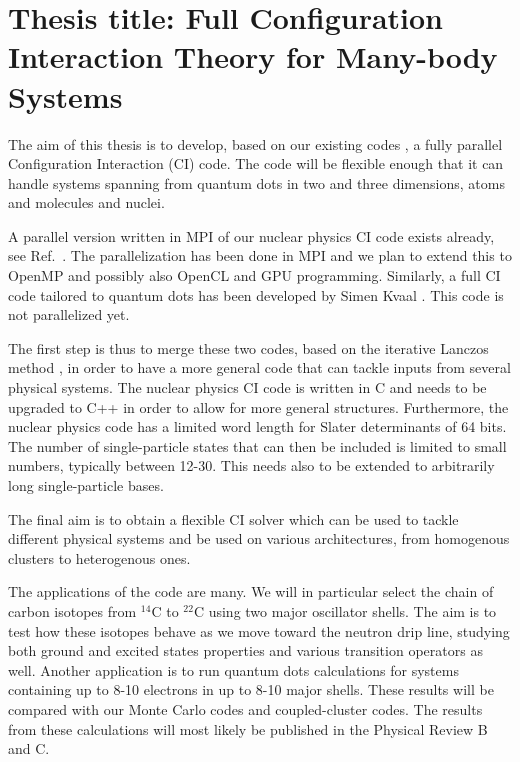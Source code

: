 \newcommand{\OP}[1]{{\bf\widehat{#1}}}

\newcommand{\be}{\begin{equation}}

\newcommand{\ee}{\end{equation}}



\pagestyle{plain}

\section*{Thesis title: Full Configuration Interaction Theory for Many-body Systems}

The aim of this thesis is to develop, based on our existing codes \cite{torgeir,simen},
a fully parallel Configuration Interaction (CI) code. The code will be 
flexible enough that it can handle
systems spanning from quantum dots in two and three dimensions, atoms and molecules and nuclei. 

A parallel version written in MPI of our nuclear physics CI code 
exists already, see Ref.~\cite{torgeir}.
The parallelization has been done in MPI and we plan to extend this to OpenMP and possibly also
OpenCL and GPU programming.  Similarly, a full CI code tailored to quantum dots has been developed
by Simen Kvaal \cite{simen}. This code is not parallelized yet.

The first step is thus to merge these two codes, 
based on the iterative Lanczos method \cite{glasgow,massimo}, 
in order to have a more general code that can tackle inputs from several physical systems. 
The nuclear physics CI code is written in C and needs to be upgraded to C++ in order to allow for more
general structures. Furthermore, the nuclear physics code 
has a limited word length for Slater determinants
of 64 bits. The number of single-particle states that can then be included is limited to small 
numbers, typically between 12-30. This needs also to be extended to arbitrarily 
long single-particle bases. 

The final aim is to obtain a flexible CI solver which can be used to tackle 
different physical systems
and be used on various architectures, from homogenous clusters to heterogenous ones.

The applications of the code are many. We will in particular select the chain of carbon isotopes
from $^{14}$C to $^{22}$C using two major oscillator shells. The aim is to test how these isotopes behave as we move toward the neutron drip line, studying both ground and excited states properties and
various transition operators as well.
Another application is to run quantum dots calculations for systems containing up to 8-10 electrons in up to 8-10 major shells. These results will be compared with our Monte Carlo codes and coupled-cluster
codes. The results from these calculations will most likely be published in the Physical Review B and C.

